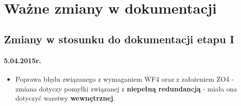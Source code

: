 \chapter{Ważne zmiany w dokumentacji}

\section{Zmiany w stosunku do dokumentacji etapu I}

\subsubsection*{5.04.2015r.}
\begin{itemize}
\item Poprawa błędu związanego z wymaganiem WF4 oraz z założeniem ZO4 - zmiana dotyczy pomyłki związanej z \textbf{niepełną redundancją} - miała ona dotyczyć warstwy \textbf{wewnętrznej}.

\end{itemize}
